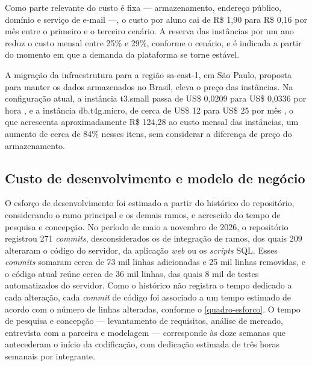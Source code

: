Como parte relevante do custo é fixa --- armazenamento, endereço público, domínio e serviço de e-mail ---, o custo por aluno cai de R\$ 1,90 para R\$ 0,16 por mês entre o primeiro e o terceiro cenário. A reserva das instâncias por um ano reduz o custo mensal entre 25\% e 29\%, conforme o cenário, e é indicada a partir do momento em que a demanda da plataforma se torne estável.

A migração da infraestrutura para a região sa-east-1, em São Paulo, proposta para manter os dados armazenados no Brasil, eleva o preço das instâncias. Na configuração atual, a instância t3.small passa de US\$ 0,0209 para US\$ 0,0336 por hora \cite{doit2026saeast1}, e a instância db.t4g.micro, de cerca de US\$ 12 para US\$ 25 por mês \cite{bytebase2026rds}, o que acrescenta aproximadamente R\$ 124,28 ao custo mensal das instâncias, um aumento de cerca de 84\% nesses itens, sem considerar a diferença de preço do armazenamento.

\subsection{Custo de desenvolvimento e modelo de negócio}

O esforço de desenvolvimento foi estimado a partir do histórico do repositório, considerando o ramo principal e os demais ramos, e acrescido do tempo de pesquisa e concepção. No período de maio a novembro de 2026, o repositório registrou 271 \textit{commits}, desconsiderados os de integração de ramos, dos quais 209 alteraram o código do servidor, da aplicação \textit{web} ou os \textit{scripts} SQL. Esses \textit{commits} somaram cerca de 73 mil linhas adicionadas e 25 mil linhas removidas, e o código atual reúne cerca de 36 mil linhas, das quais 8 mil de testes automatizados do servidor. Como o histórico não registra o tempo dedicado a cada alteração, cada \textit{commit} de código foi associado a um tempo estimado de acordo com o número de linhas alteradas, conforme o \autoref{quadro-esforco}. O tempo de pesquisa e concepção --- levantamento de requisitos, análise de mercado, entrevista com a parceira e modelagem --- corresponde às doze semanas que antecederam o início da codificação, com dedicação estimada de três horas semanais por integrante.

